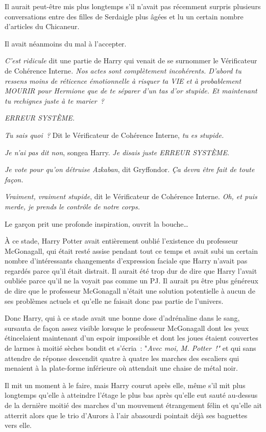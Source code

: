Il aurait peut-être mis plus longtemps s'il n'avait pas récemment surpris plusieurs conversations entre des filles de Serdaigle plus âgées et lu un certain nombre d'articles du Chicaneur.

Il avait néanmoins du mal à l'accepter.

\emph{C'est ridicule} dit une partie de Harry qui venait de se surnommer le Vérificateur de Cohérence Interne\emph{. Nos actes sont complètement incohérents. D'abord tu ressens moins de réticence émotionnelle à risquer ta VIE et à probablement MOURIR pour Hermione que de te séparer d'un tas d'or stupide. Et maintenant tu rechignes juste à te marier~?}

\emph{ERREUR SYSTÈME.}

\emph{Tu sais quoi~?} Dit le Vérificateur de Cohérence Interne, \emph{tu es stupide.}

\emph{Je n'ai pas dit non}, songea Harry. \emph{Je disais juste ERREUR SYSTÈME.}

\emph{Je vote pour qu'on détruise Azkaban}, dit Gryffondor. \emph{Ça devra être fait de toute façon.}

\emph{Vraiment, vraiment stupide}, dit le Vérificateur de Cohérence Interne. \emph{Oh, et puis merde, je prends le contrôle de notre corps.}

Le garçon prit une profonde inspiration, ouvrit la bouche…

À ce stade, Harry Potter avait entièrement oublié l'existence du professeur McGonagall, qui était resté assise pendant tout ce temps et avait subi un certain nombre d'intéressants changements d'expression faciale que Harry n'avait pas regardés parce qu'il était distrait. Il aurait été trop dur de dire que Harry l'avait oubliée parce qu'il ne la voyait pas comme un PJ. Il aurait pu être plus généreux de dire que le professeur McGonagall n'était une solution potentielle à aucun de ses problèmes actuels et qu'elle ne faisait donc pas partie de l'univers.

Donc Harry, qui à ce stade avait une bonne dose d'adrénaline dans le sang, sursauta de façon assez visible lorsque le professeur McGonagall dont les yeux étincelaient maintenant d'un espoir impossible et dont les joues étaient couvertes de larmes à moitié sèches bondit et s'écria~: "\emph{Avec moi, M. Potter~!"} et qui sans attendre de réponse descendit quatre à quatre les marches des escaliers qui menaient à la plate-forme inférieure où attendait une chaise de métal noir.

Il mit un moment à le faire, mais Harry courut après elle, même s'il mit plus longtemps qu'elle à atteindre l'étage le plus bas après qu'elle eut sauté au-dessus de la dernière moitié des marches d'un mouvement étrangement félin et qu'elle ait atterrit alors que le trio d'Aurors à l'air abasourdi pointait déjà ses baguettes vers elle.

